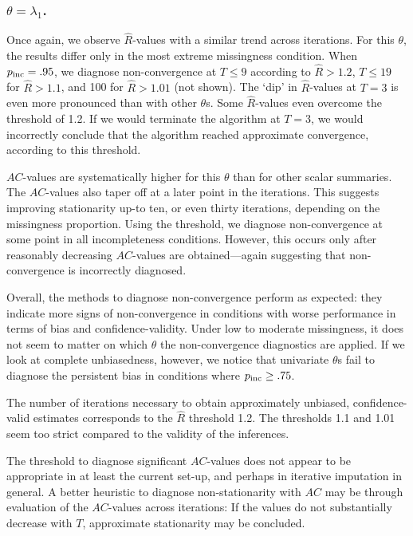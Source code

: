 \documentclass[Royal,times,sageh]{sagej}
\begin{document}
\hypertarget{thetalambda_1.}{%
\subsubsection{\texorpdfstring{\(\theta=\lambda_{1}\).}{\textbackslash theta=\textbackslash lambda\_\{1\}.}}\label{thetalambda_1.}}

Once again, we observe \(\widehat{R}\)-values with a similar trend across iterations. For this \(\theta\), the results differ only in the most extreme missingness condition. When \(p_{\rm inc}=.95\), we diagnose non-convergence at \(T\leq9\) according to \(\widehat{R}>1.2\), \(T\leq19\) for \(\widehat{R}>1.1\), and 100 for \(\widehat{R}>1.01\) (not shown). The `dip' in \(\widehat{R}\)-values at \(T=3\) is even more pronounced than with other \(\theta\)s. Some \(\widehat{R}\)-values even overcome the threshold of 1.2. If we would terminate the algorithm at \(T=3\), we would incorrectly conclude that the algorithm reached approximate convergence, according to this threshold.

\(AC\)-values are systematically higher for this \(\theta\) than for other scalar summaries. The \(AC\)-values also taper off at a later point in the iterations. This suggests improving stationarity up-to ten, or even thirty iterations, depending on the missingness proportion. Using the threshold, we diagnose non-convergence at some point in all incompleteness conditions. However, this occurs only after reasonably decreasing \(AC\)-values are obtained---again suggesting that non-convergence is incorrectly diagnosed. \newline  

\noindent Overall, the methods to diagnose non-convergence perform as expected: they indicate more signs of non-convergence in conditions with worse performance in terms of bias and confidence-validity. Under low to moderate missingness, it does not seem to matter on which \(\theta\) the non-convergence diagnostics are applied. If we look at complete unbiasedness, however, we notice that univariate \(\theta\)s fail to diagnose the persistent bias in conditions where \(p_{\rm inc}\geq.75\).

The number of iterations necessary to obtain approximately unbiased, confidence-valid estimates corresponds to the \(\widehat{R}\) threshold 1.2. The thresholds 1.1 and 1.01 seem too strict compared to the validity of the inferences.

The threshold to diagnose significant \(AC\)-values does not appear to be appropriate in at least the current set-up, and perhaps in iterative imputation in general. A better heuristic to diagnose non-stationarity with \(AC\) may be through evaluation of the \(AC\)-values across iterations: If the values do not substantially decrease with \(T\), approximate stationarity may be concluded.
\end{document}

